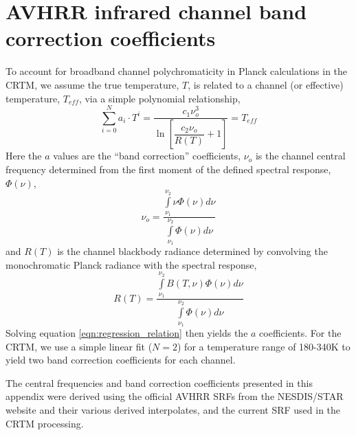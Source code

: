 \section{AVHRR infrared channel band correction coefficients}
\label{app:band_correction_coefficients}
To account for broadband channel polychromaticity in Planck calculations in the CRTM, we assume the true temperature, $T$, is related to a channel (or effective) temperature, $T_{eff}$, via a simple polynomial relationship,
\begin{equation}
  \sum_{i=0}^{N} a_i\cdot T^{i} = \dfrac{c_1\nu_o^3}{\ln\left[ \dfrac{c_2\nu_o}{R(T)}+1 \right]} = T_{eff}
  \label{eqn:regression_relation}
\end{equation}
Here the $a$ values are the ``band correction'' coefficients, $\nu_o$ is the channel central frequency determined from the first moment of the defined spectral response, $\Phi(\nu)$,
\begin{equation}
  \nu_o = \dfrac{\int\limits_{\nu_1}^{\nu_2}\nu\Phi(\nu)d\nu}{\int\limits_{\nu_1}^{\nu_2}\Phi(\nu)d\nu}
\end{equation}
and $R(T)$ is the channel blackbody radiance determined by convolving the monochromatic Planck radiance with the spectral response,
\begin{equation}
  R(T) = \dfrac{\int\limits_{\nu_1}^{\nu_2}B(T,\nu)\Phi(\nu)d\nu}{\int\limits_{\nu_1}^{\nu_2}\Phi(\nu)d\nu}
\end{equation}
Solving equation \ref{eqn:regression_relation} then yields the $a$ coefficients. For the CRTM, we use a simple linear fit ($N=2$) for a temperature range of 180-340K to yield two band correction coefficients for each channel.

The central frequencies and band correction coefficients presented in this appendix were derived using the official AVHRR SRFs from the NESDIS/STAR website \citep{NESDIS_AVHRR_SRFs} and their various derived interpolates, and the current SRF used in the CRTM processing.

